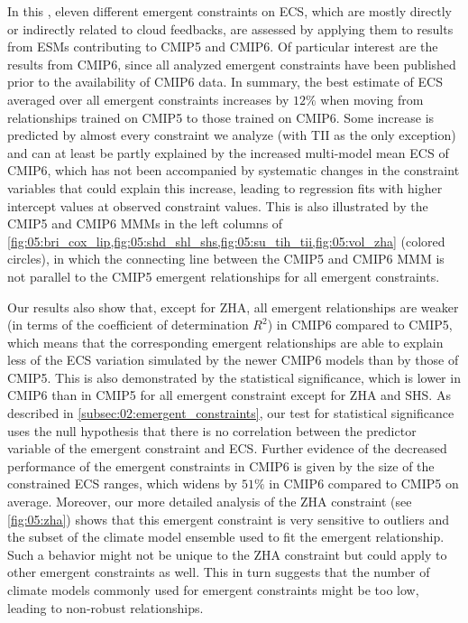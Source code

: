 In this , eleven different emergent constraints on
\ac{ECS}, which are mostly directly or indirectly related to cloud feedbacks,
are assessed by applying them to results from \acp{ESM} contributing to
\acs{CMIP}5 and \acs{CMIP}6. Of particular interest are the results from
\acs{CMIP}6, since all analyzed emergent constraints have been published prior
to the availability of \acs{CMIP}6 data. In summary, the best estimate of
\ac{ECS} averaged over all emergent constraints increases by $12 \unit{\%}$
when moving from relationships trained on \acs{CMIP}5 to those trained on
\acs{CMIP}6. Some increase is predicted by almost every constraint we analyze
(with TII as the only exception) and can at least be partly explained by the
increased multi-model mean \ac{ECS} of \acs{CMIP}6, which has not been
accompanied by systematic changes in the constraint variables that could
explain this increase, leading to regression fits with higher intercept values
at observed constraint values. This is also illustrated by the \acs{CMIP}5 and
\acs{CMIP}6 \acp{MMM} in the left columns of
\cref{fig:05:bri_cox_lip,fig:05:shd_shl_shs,fig:05:su_tih_tii,fig:05:vol_zha}
(colored circles), in which the connecting line between the \acs{CMIP}5 and
\acs{CMIP}6 \ac{MMM} is not parallel to the \acs{CMIP}5 emergent relationships
for all emergent constraints.

Our results also show that, except for ZHA, all emergent relationships are
weaker (in terms of the coefficient of determination $R^2$) in \acs{CMIP}6
compared to \acs{CMIP}5, which means that the corresponding emergent
relationships are able to explain less of the \ac{ECS} variation simulated by
the newer \acs{CMIP}6 models than by those of \acs{CMIP}5. This is also
demonstrated by the statistical significance, which is lower in \acs{CMIP}6
than in \acs{CMIP}5 for all emergent constraint except for ZHA and SHS. As
described in \cref{subsec:02:emergent_constraints}, our test for statistical
significance uses the null hypothesis that there is no correlation between the
predictor variable of the emergent constraint and \ac{ECS}. Further evidence of
the decreased performance of the emergent constraints in \acs{CMIP}6 is given
by the size of the constrained \acs{ECS} ranges, which widens by $51 \unit{\%}$
in \acs{CMIP}6 compared to \acs{CMIP}5 on average. Moreover, our more detailed
analysis of the ZHA constraint (see \cref{fig:05:zha}) shows that this emergent
constraint is very sensitive to outliers and the subset of the climate model
ensemble used to fit the emergent relationship. Such a behavior might not be
unique to the ZHA constraint but could apply to other emergent constraints as
well. This in turn suggests that the number of climate models commonly used for
emergent constraints might be too low, leading to non-robust relationships.

